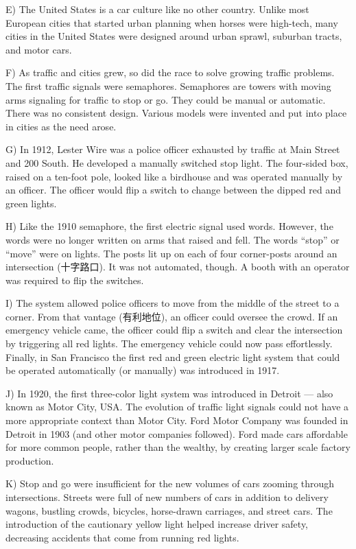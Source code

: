 \documentclass[UTF8,11pt]{ctexart}
\begin{document}
E) The United States is a car culture like no other country. Unlike most European cities that started urban planning when horses were high-tech, many cities in the United States were designed around urban sprawl, suburban tracts, and motor cars.


F) As traffic and cities grew, so did the race to solve growing traffic problems. The first traffic signals were semaphores. Semaphores are towers with moving arms signaling for traffic to stop or go. They could be manual or automatic. There was no consistent design. Various models were invented and put into place in cities as the need arose.


G) In 1912, Lester Wire was a police officer exhausted by traffic at Main Street and 200 South. He developed a manually switched stop light. The four-sided box, raised on a ten-foot pole, looked like a birdhouse and was operated manually by an officer. The officer would flip a switch to change between the dipped red and green lights.


H) Like the 1910 semaphore, the first electric signal used words. However, the words were no longer written on arms that raised and fell. The words “stop” or “move” were on lights. The posts lit up on each of four corner-posts around an intersection (十字路口). It was not automated, though. A booth with an operator was required to flip the switches.


I) The system allowed police officers to move from the middle of the street to a corner. From that vantage (有利地位), an officer could oversee the crowd. If an emergency vehicle came, the officer could flip a switch and clear the intersection by triggering all red lights. The emergency vehicle could now pass effortlessly. Finally, in San Francisco the first red and green electric light system that could be operated automatically (or manually) was introduced in 1917.


J) In 1920, the first three-color light system was introduced in Detroit — also known as Motor City, USA. The evolution of traffic light signals could not have a more appropriate context than Motor City. Ford Motor Company was founded in Detroit in 1903 (and other motor companies followed). Ford made cars affordable for more common people, rather than the wealthy, by creating larger scale factory production.


K) Stop and go were insufficient for the new volumes of cars zooming through intersections. Streets were full of new numbers of cars in addition to delivery wagons, bustling crowds, bicycles, horse-drawn carriages, and street cars. The introduction of the cautionary yellow light helped increase driver safety, decreasing accidents that come from running red lights.
\end{document}
